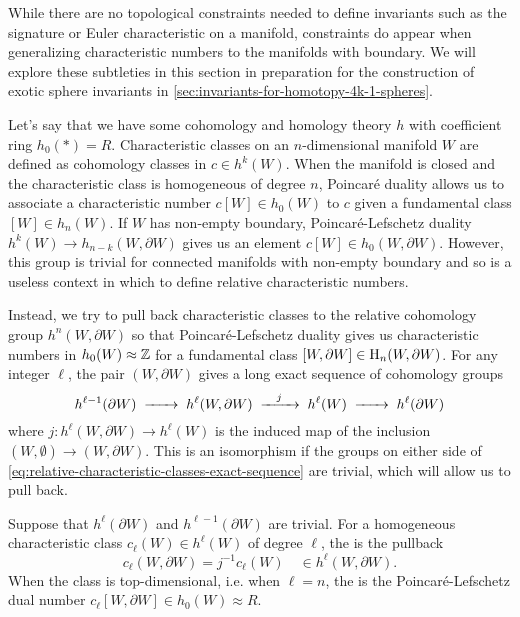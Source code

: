 While there are no topological constraints needed to define invariants such as the signature or Euler characteristic on a manifold, constraints do appear when generalizing characteristic numbers to the manifolds with boundary. We will explore these subtleties in this section in preparation for the construction of exotic sphere invariants in \cref{sec:invariants-for-homotopy-4k-1-spheres}.

Let's say that we have some cohomology and homology theory $h$ with coefficient ring $h_0(*)=R$.
Characteristic classes on an $n$-dimensional manifold $W$ are defined as cohomology classes in $c\in h^k(W)$. When the manifold is closed and the characteristic class is homogeneous of degree $n$, Poincar\'e duality allows us to associate a characteristic number $c[W]\in h_0(W)$ to $c$ given a fundamental class $[W]\in h_n(W)$. If $W$ has non-empty boundary, Poincar\'e-Lefschetz duality $h^k(W)\to h_{n-k}(W,\partial W)$ gives us an element $c[W]\in h_0(W,\partial W)$. However, this group is trivial for connected manifolds with non-empty boundary and so is a useless context in which to define relative characteristic numbers.

Instead, we try to pull back characteristic classes to the relative cohomology group $h^n(W,\partial W)$ so that Poincar\'e-Lefschetz duality gives us characteristic numbers in $h_0(W)\approx \mathbb{Z}$ for a fundamental class $[W,\partial W]\in \operatorname{H}_n(W,\partial W)$.
For any integer $\ell$, the pair $(W, \partial W)$ gives a long exact sequence of cohomology groups
\begin{equation}\label{eq:relative-characteristic-classes-exact-sequence}
	h^{\ell-1}(\partial W) \lkxto h^{\ell}(W, \partial W) \lkxto[j] h^{\ell}(W) \lkxto h^{\ell}(\partial W)
\end{equation}
where $j : h^{\ell}(W, \partial W) \to h^{\ell}(W)$ is the induced map of the inclusion $(W,\emptyset) \to (W, \partial W)$. This is an isomorphism if the groups on either side of \cref{eq:relative-characteristic-classes-exact-sequence} are trivial, which will allow us to pull back.

\begin{definition}\label{defn:relative-characteristic_form}
	Suppose that $h^{\ell}(\partial W)$ and $h^{\ell-1}(\partial W)$ are trivial. For a homogeneous characteristic class $c_\ell(W) \in h^{\ell}(W)$ of degree $\ell$, the  is the pullback
	\[
		c_\ell(W, \partial W) = j^{-1} c_\ell(W) \quad\in h^{\ell}(W, \partial W).
	\]
	When the class is top-dimensional, i.e. when $\ell=n$, the  is the Poincar\'e-Lefschetz dual number $c_\ell[W,\partial W] \in h_0(W)\approx R$.
\end{definition}

